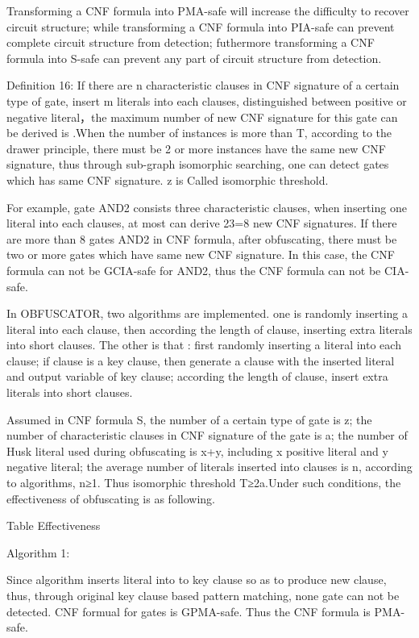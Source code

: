 \documentclass[runningheads,a4paper]{llncs}
\begin{document}
Transforming a CNF formula into PMA-safe will increase the difficulty to recover circuit structure; while transforming a CNF formula into PIA-safe can prevent complete circuit structure from detection; futhermore  transforming a CNF formula into S-safe can prevent any part of circuit structure from detection.

\noindent \newline Definition 16: If there are n characteristic clauses in CNF signature of a certain type of gate, insert m literals into each clauses, distinguished between positive or negative literal，the maximum number of new CNF signature for this gate can be derived is  .When the number of instances is more than T, according to the drawer principle, there must be 2 or more instances have the same new CNF signature, thus through sub-graph isomorphic searching, one can detect gates which has same CNF signature. z is Called isomorphic threshold.

For example, gate AND2 consists three characteristic clauses, when inserting one literal into each clauses, at most can derive 23=8 new CNF signatures. If there are more than 8 gates AND2 in CNF formula, after obfuscating, there must be two or more gates which have same new CNF signature. In this case, the CNF formula can not be GCIA-safe for AND2, thus the CNF formula can not be CIA-safe.

In OBFUSCATOR, two algorithms are implemented. one is randomly inserting a literal into each clause, then according the length of clause, inserting extra literals into short clauses. The other is that : first randomly inserting a literal into each clause; if clause is a key clause, then generate a clause with the inserted literal and output variable of key clause; according the length of clause, insert extra literals into short clauses.

Assumed in CNF formula S, the number of a certain type of gate is z; the number of characteristic clauses in CNF signature of the gate is a; the number of Husk literal used during obfuscating is x+y, including x positive literal and y negative literal; the average number of literals inserted into clauses is n, according to algorithms, n≥1. Thus isomorphic threshold T≥2a.Under such conditions, the effectiveness of obfuscating is as following. 

Table Effectiveness

\noindent Algorithm 1:

Since algorithm inserts literal into to key clause so as to produce new clause, thus, through original key clause based pattern matching, none gate can not be detected. CNF formual for gates is GPMA-safe. Thus the CNF formula is PMA-safe.
\end{document}
